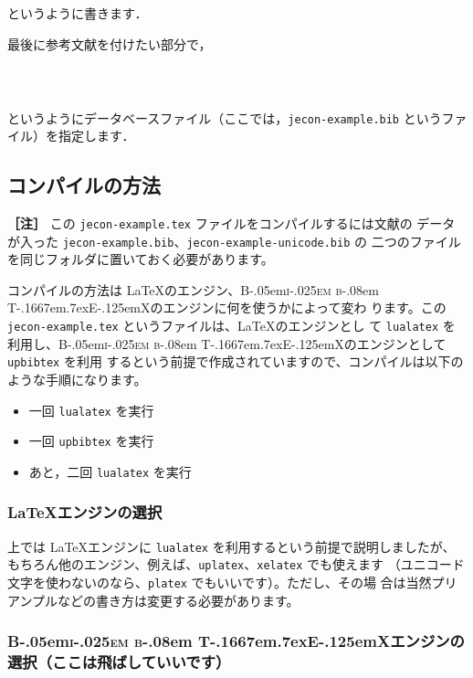 \documentclass[article]{jlreq}
\newcommand{\BibTeX}{\textrm{B\kern-.05em\textsc{i\kern-.025em b}\kern-.08em%
T\kern-.1667em\lower.7ex\hbox{E}\kern-.125emX}}
\newcommand{\midashii}[1]{\noindent \textbf{［#1］}}
\begin{document}
というように書きます．

最後に参考文献を付けたい部分で，

\begin{screen}
 \begin{verbatim}
        
 
 \end{verbatim}
\end{screen}

というようにデータベースファイル（ここでは，\texttt{jecon-example.bib} というファ
イル）を指定します．

\subsection{コンパイルの方法}

\midashii{注} この \texttt{jecon-example.tex} ファイルをコンパイルするには文献の
データが入った \texttt{jecon-example.bib}、\texttt{jecon-example-unicode.bib} の
二つのファイルを同じフォルダに置いておく必要があります。

\vspace*{2em}



コンパイルの方法は \LaTeX のエンジン、\BibTeX のエンジンに何を使うかによって変わ
ります。この \texttt{jecon-example.tex} というファイルは、\LaTeX のエンジンとし
て \texttt{lualatex} を利用し、\BibTeX のエンジンとして \texttt{upbibtex} を利用
するという前提で作成されていますので、コンパイルは以下のような手順になります。
\begin{itemize}
 \item 一回 \texttt{lualatex} を実行
 \item 一回 \texttt{upbibtex} を実行
 \item あと，二回 \texttt{lualatex} を実行
\end{itemize}


\subsubsection{\LaTeX エンジンの選択}

上では \LaTeX エンジンに \texttt{lualatex} を利用するという前提で説明しましたが、
もちろん他のエンジン、例えば、\texttt{uplatex}、\texttt{xelatex} でも使えます
（ユニコード文字を使わないのなら、\texttt{platex} でもいいです）。ただし、その場
合は当然プリアンプルなどの書き方は変更する必要があります。


\subsubsection{\BibTeX エンジンの選択（ここは飛ばしていいです）}
\label{jecon-example-sec:bibtex-engine}
\end{document}
